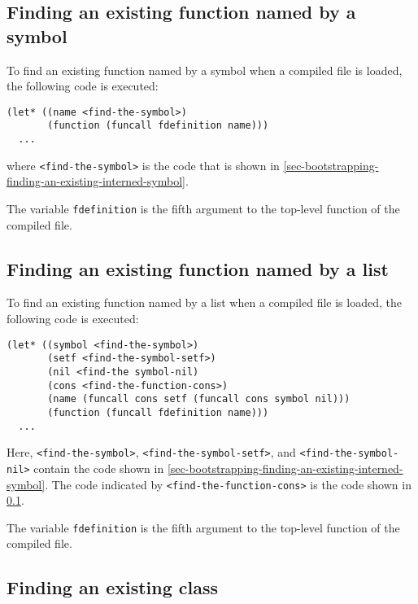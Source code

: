 \subsection{Finding an existing function named by a symbol}
\label{sec-bootstrapping-finding-an-existing-function-named-by-a-symbol}

To find an existing function named by a symbol when a compiled file is
loaded, the following code is executed:

\begin{verbatim}
(let* ((name <find-the-symbol>)
       (function (funcall fdefinition name)))
  ...
\end{verbatim}

where \texttt{<find-the-symbol>} is the code that is shown in
\ref{sec-bootstrapping-finding-an-existing-interned-symbol}.

The variable \texttt{fdefinition} is the fifth argument to the
top-level function of the compiled file.

\subsection{Finding an existing function named by a list}
\label{sec-bootstrapping-finding-an-existing-function-named-by-a-list}

To find an existing function named by a list when a compiled file is
loaded, the following code is executed:

\begin{verbatim}
(let* ((symbol <find-the-symbol>)
       (setf <find-the-symbol-setf>)
       (nil <find-the symbol-nil)
       (cons <find-the-function-cons>)
       (name (funcall cons setf (funcall cons symbol nil)))
       (function (funcall fdefinition name)))
  ...
\end{verbatim}

Here, \texttt{<find-the-symbol>}, \texttt{<find-the-symbol-setf>}, and
\texttt{<find-the-symbol-nil>} contain the code shown in
\ref{sec-bootstrapping-finding-an-existing-interned-symbol}.  The code
indicated by \texttt{<find-the-function-cons>} is the code shown in
\ref{sec-bootstrapping-finding-an-existing-function-named-by-a-symbol}.

The variable \texttt{fdefinition} is the fifth argument to the
top-level function of the compiled file.

\subsection{Finding an existing class}
\label{sec-bootstrapping-finding-an-existing-class}

